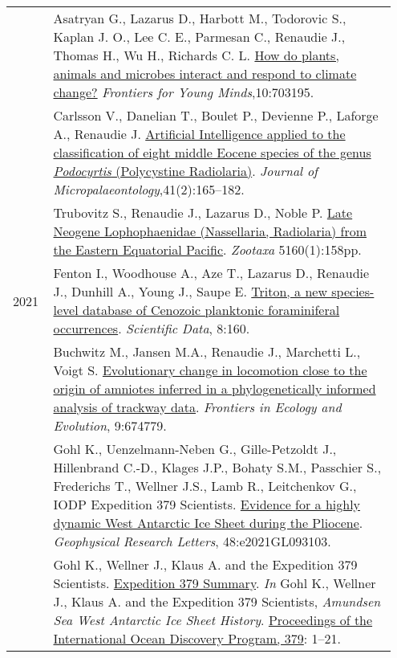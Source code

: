 \documentclass[11pt, a4paper]{article}
\makeatletter
\newcommand\fnoteref[1]{\protected@xdef\@theenmark{\ref{#1}}\@endnotemark}
\makeatother
\begin{document}
\begin{longtable}{@{}p{0.1\linewidth} >{\small}P{0.85\linewidth}@{}}
    & Asatryan G., Lazarus D., Harbott M., Todorovic S., Kaplan J. O., Lee C. E., Parmesan C., Renaudie J., Thomas H., Wu H., Richards C. L. \href{http://doi.org/10.3389/frym.2022.703195}{How do plants, animals and microbes interact and respond to climate change?} \textit{Frontiers for Young Minds},10:703195.\\
    & Carlsson V., Danelian T., Boulet P., Devienne P., Laforge A., Renaudie J. \href{https://doi.org/10.5194/jm-41-165-2022}{Artificial Intelligence applied to the classification of eight middle Eocene species of the genus \textit{Podocyrtis} (Polycystine Radiolaria)}. \textit{Journal of Micropalaeontology},41(2):165--182.\\
    & Trubovitz S., Renaudie J., Lazarus D., Noble P. \href{https://doi.org/10.11646/zootaxa.5160.1}{Late Neogene Lophophaenidae (Nassellaria, Radiolaria) from the Eastern Equatorial Pacific}. \textit{Zootaxa} 5160(1):158pp.\\
2021
    & Fenton I., Woodhouse A., Aze T., Lazarus D., Renaudie J., Dunhill A., Young J., Saupe E. \href{https://www.nature.com/articles/s41597-021-00942-7}{Triton, a new species-level database of Cenozoic planktonic foraminiferal occurrences}. \textit{Scientific Data}, 8:160.\\
    & Buchwitz M., Jansen M.A., Renaudie J., Marchetti L., Voigt S. \href{http://doi.org/10.3389/fevo.2021.674779}{Evolutionary change in locomotion close to the origin of amniotes inferred in a phylogenetically informed analysis of trackway data}. \textit{Frontiers in Ecology and Evolution}, 9:674779.\\
    & Gohl K., Uenzelmann-Neben G., Gille-Petzoldt J., Hillenbrand C.-D., Klages J.P., Bohaty S.M., Passchier S., Frederichs T., Wellner J.S., Lamb R., Leitchenkov G., IODP Expedition 379 Scientists\fnoteref{exp379scientists2}. \href{https://agupubs.onlinelibrary.wiley.com/doi/10.1029/2021GL093103?af=R}{Evidence for a highly dynamic West Antarctic Ice Sheet during the Pliocene}. \textit{Geophysical Research Letters}, 48:e2021GL093103.\\
    & Gohl K., Wellner J., Klaus A. and the Expedition 379 Scientists\fnoteref{exp379scientists}. \href{https://doi.org/10.14379/iodp.proc.379.101.2021}{Expedition 379 Summary}. \textit{In} Gohl K., Wellner J., Klaus A. and the Expedition 379 Scientists, \textit{Amundsen Sea West Antarctic Ice Sheet History}. \href{http://publications.iodp.org/proceedings/379/379title.html}{Proceedings of the International Ocean Discovery Program, 379}: 1--21.\\

\end{longtable}
\end{document}
